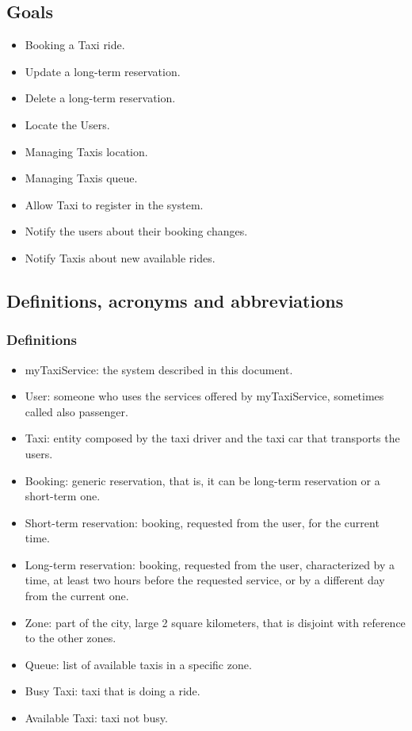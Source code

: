 	\subsection{Goals}
	\begin{itemize}
		\item Booking a Taxi ride.
		\item Update a long-term reservation.
		\item Delete a long-term reservation.
		\item Locate the Users.
		\item Managing Taxis location.
		\item Managing Taxis queue.
		\item Allow Taxi to register in the system.
		\item Notify the users about their booking changes.
		\item Notify Taxis about new available rides.
	\end{itemize}
	
	\subsection{Definitions, acronyms and abbreviations}
		\subsubsection{Definitions}
		\begin{itemize}
			\item myTaxiService: the system described in this document.
			\item User: someone who uses the services offered by myTaxiService, sometimes called also passenger.
			\item Taxi: entity composed by the taxi driver and the taxi car that transports the users.
			\item Booking: generic reservation, that is, it can be long-term reservation or a short-term one.
			\item Short-term reservation: booking, requested from the user, for the current time.
			\item Long-term reservation: booking, requested from the user, characterized by a time, at least two hours before the requested service, or by a different day from the current one.
			\item Zone: part of the city, large 2 square kilometers, that is disjoint with reference to the other zones.
			\item Queue: list of available taxis in a specific zone.
			\item Busy Taxi: taxi that is doing a ride.
			\item Available Taxi: taxi not busy.
		\end{itemize}
